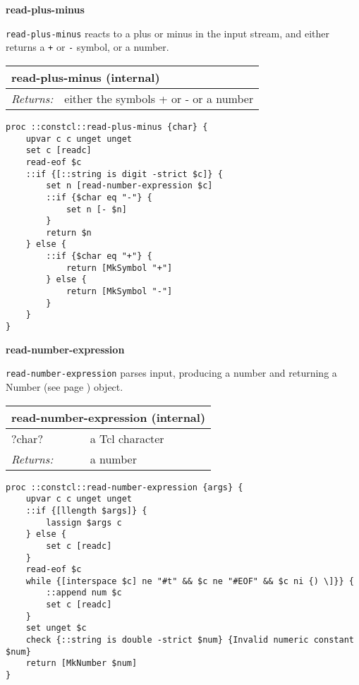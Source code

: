 \documentclass{report}
\begin{document}
\textbf{read-plus-minus}


\texttt{read-plus-minus} reacts to a plus or minus in the input stream, and either returns a \texttt{+} or \texttt{-} symbol, or a number.

\begin{tabular}{ |l l| }
\hline
\multicolumn{2}{|l|}{read-plus-minus (internal)} \\
\hline
\textit{Returns:} & either the symbols + or - or a number \\
\hline
\end{tabular}

\noindent\makebox[\linewidth]{\rule{\linewidth}{0.4pt}}
\begin{lstlisting}
proc ::constcl::read-plus-minus {char} {
    upvar c c unget unget
    set c [readc]
    read-eof $c
    ::if {[::string is digit -strict $c]} {
        set n [read-number-expression $c]
        ::if {$char eq "-"} {
            set n [- $n]
        }
        return $n
    } else {
        ::if {$char eq "+"} {
            return [MkSymbol "+"]
        } else {
            return [MkSymbol "-"]
        }
    }
}
\end{lstlisting}
\noindent\makebox[\linewidth]{\rule{\linewidth}{0.4pt}}

\textbf{read-number-expression}


\texttt{read-number-expression} parses input, producing a number and returning a Number (see page \pageref{numbers}) object.

\begin{tabular}{ |l l| }
\hline
\multicolumn{2}{|l|}{read-number-expression (internal)} \\
\hline
?char? & a Tcl character \\
\textit{Returns:} & a number \\
\hline
\end{tabular}

\noindent\makebox[\linewidth]{\rule{\linewidth}{0.4pt}}
\begin{lstlisting}
proc ::constcl::read-number-expression {args} {
    upvar c c unget unget
    ::if {[llength $args]} {
        lassign $args c
    } else {
        set c [readc]
    }
    read-eof $c
    while {[interspace $c] ne "#t" && $c ne "#EOF" && $c ni {) \]}} {
        ::append num $c
        set c [readc]
    }
    set unget $c
    check {::string is double -strict $num} {Invalid numeric constant $num}
    return [MkNumber $num]
}
\end{lstlisting}
\noindent\makebox[\linewidth]{\rule{\linewidth}{0.4pt}}
\end{document}
